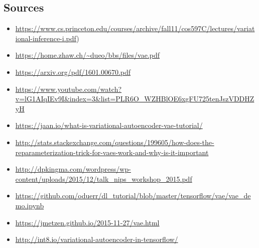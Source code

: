 \documentclass[]{article}
\begin{document}
\subsection{Sources}
\label{sec:sources}
\begin{itemize}
    \item \url{https://www.cs.princeton.edu/courses/archive/fall11/cos597C/lectures/variational-inference-i.pdf})
    \item \url{https://home.zhaw.ch/~dueo/bbs/files/vae.pdf}
    \item \url{https://arxiv.org/pdf/1601.00670.pdf}
    \item \url{https://www.youtube.com/watch?v=lG1AIqIEv9I&index=3&list=PLR6O_WZHBlOE6xgFU725tenJszVDDHZyH}
    \item \url{https://jaan.io/what-is-variational-autoencoder-vae-tutorial/}
    \item \url{http://stats.stackexchange.com/questions/199605/how-does-the-reparameterization-trick-for-vaes-work-and-why-is-it-important}
    \item \url{http://dpkingma.com/wordpress/wp-content/uploads/2015/12/talk_nips_workshop_2015.pdf}
    \item \url{https://github.com/oduerr/dl_tutorial/blob/master/tensorflow/vae/vae_demo.ipynb}
    \item \url{https://jmetzen.github.io/2015-11-27/vae.html}
    \item \url{http://int8.io/variational-autoencoder-in-tensorflow/}  
     
        
        
        
\end{itemize}
\end{document}

